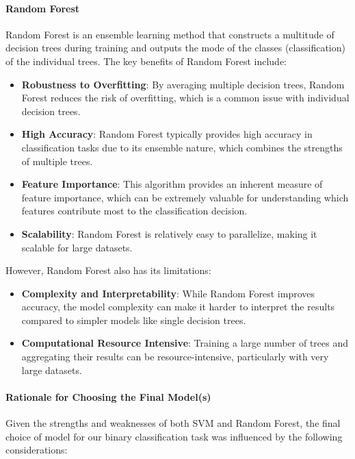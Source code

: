 \paragraph{Random Forest}

Random Forest is an ensemble learning method that constructs a multitude of decision trees during training and outputs the mode of the classes (classification) of the individual trees. The key benefits of Random Forest include:

\begin{itemize}
    \item \textbf{Robustness to Overfitting}: By averaging multiple decision trees, Random Forest reduces the risk of overfitting, which is a common issue with individual decision trees.
    \item \textbf{High Accuracy}: Random Forest typically provides high accuracy in classification tasks due to its ensemble nature, which combines the strengths of multiple trees.
    \item \textbf{Feature Importance}: This algorithm provides an inherent measure of feature importance, which can be extremely valuable for understanding which features contribute most to the classification decision.
    \item \textbf{Scalability}: Random Forest is relatively easy to parallelize, making it scalable for large datasets.
\end{itemize}

However, Random Forest also has its limitations:
\begin{itemize}
    \item \textbf{Complexity and Interpretability}: While Random Forest improves accuracy, the model complexity can make it harder to interpret the results compared to simpler models like single decision trees.
    \item \textbf{Computational Resource Intensive}: Training a large number of trees and aggregating their results can be resource-intensive, particularly with very large datasets.
\end{itemize}

\paragraph{Rationale for Choosing the Final Model(s)}

Given the strengths and weaknesses of both SVM and Random Forest, the final choice of model for our binary classification task was influenced by the following considerations:

